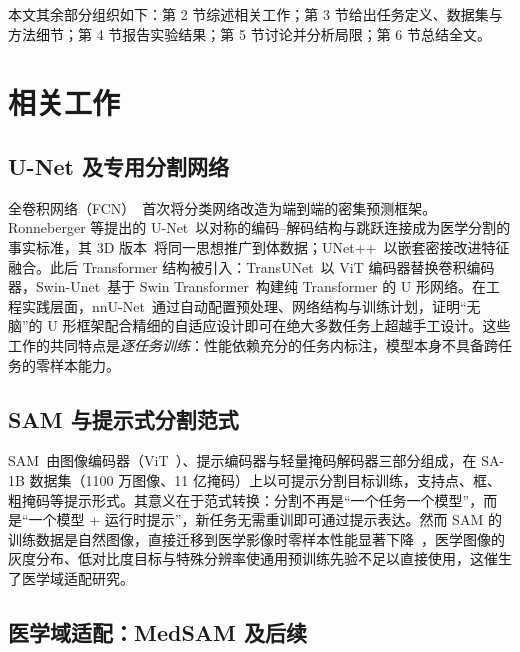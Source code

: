 \documentclass[zihao=-4,a4paper]{ctexart}
\begin{document}
本文其余部分组织如下：第 2 节综述相关工作；第 3 节给出任务定义、数据集与方法细节；第 4 节报告实验结果；第 5 节讨论并分析局限；第 6 节总结全文。

\section{相关工作}

\subsection{U-Net 及专用分割网络}

全卷积网络（FCN）~\cite{long2015fcn}首次将分类网络改造为端到端的密集预测框架。Ronneberger 等提出的 U-Net~\cite{ronneberger2015unet}以对称的编码--解码结构与跳跃连接成为医学分割的事实标准，其 3D 版本~\cite{cicek2016unet3d}将同一思想推广到体数据；UNet++~\cite{zhou2018unetpp}以嵌套密接改进特征融合。此后 Transformer 结构被引入：TransUNet~\cite{chen2021transunet}以 ViT 编码器替换卷积编码器，Swin-Unet~\cite{cao2022swinunet}基于 Swin Transformer~\cite{liu2021swin}构建纯 Transformer 的 U 形网络。在工程实践层面，nnU-Net~\cite{isensee2021nnunet}通过自动配置预处理、网络结构与训练计划，证明``无脑''的 U 形框架配合精细的自适应设计即可在绝大多数任务上超越手工设计。这些工作的共同特点是\emph{逐任务训练}：性能依赖充分的任务内标注，模型本身不具备跨任务的零样本能力。

\subsection{SAM 与提示式分割范式}

SAM~\cite{kirillov2023segment}由图像编码器（ViT~\cite{dosovitskiy2021vit}）、提示编码器与轻量掩码解码器三部分组成，在 SA-1B 数据集（1100 万图像、11 亿掩码）上以可提示分割目标训练，支持点、框、粗掩码等提示形式。其意义在于范式转换：分割不再是``一个任务一个模型''，而是``一个模型 + 运行时提示''，新任务无需重训即可通过提示表达。然而 SAM 的训练数据是自然图像，直接迁移到医学影像时零样本性能显著下降~\cite{huang2024sam}，医学图像的灰度分布、低对比度目标与特殊分辨率使通用预训练先验不足以直接使用，这催生了医学域适配研究。

\subsection{医学域适配：MedSAM 及后续}
\end{document}
